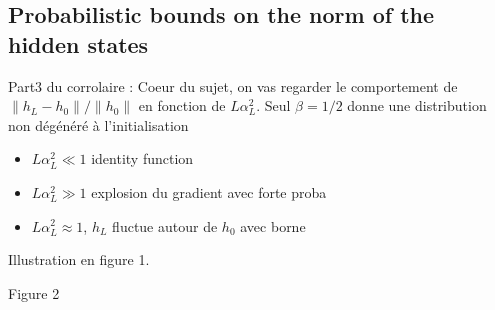 \documentclass{article}
\theoremstyle{plain}%
\theoremstyle{definition}
\theoremstyle{remark}
\begin{document}
\subsection{Probabilistic bounds on the norm of the hidden states}
Part3 du corrolaire  : Coeur du sujet, on vas regarder le comportement de $ \left\| h_L - h_0 \right\| / \left\| h_0 \right\|  $ en fonction de $ L \alpha _L ^2 $. Seul $ \beta = 1/2 $ donne une distribution non dégénéré à l'initialisation
\begin{itemize}
    \item $ L \alpha _L ^2 \ll 1 $  identity function
    \item $ L \alpha _L ^2 \gg 1 $  explosion du gradient avec forte proba
    \item $ L \alpha _L ^2 \approx 1 $, $ h_L $ fluctue autour de $ h_0 $ avec borne
\end{itemize}
Illustration en figure 1.

Figure 2 
\end{document}
